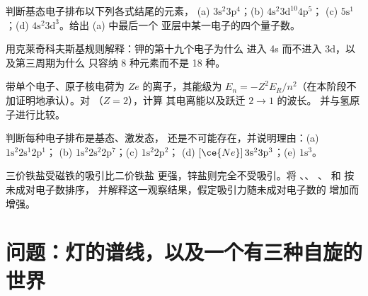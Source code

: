 \begin{exercise}[$\star\star$]\label{exo:b1:quantum-numbers:8}
判断基态电子排布以下列各式结尾的元素，
(a) $3\text{s}^2 3\text{p}^4$；(b) $4\text{s}^2 3\text{d}^{10} 4\text{p}^5$；
(c) $5\text{s}^1$；(d) $4\text{s}^2 3\text{d}^3$。给出 (a) 中最后一个
亚层中某一电子的四个量子数。
\end{exercise}

\begin{exercise}[$\star\star$]\label{exo:b1:quantum-numbers:9}
用克莱奇科夫斯基规则解释：钾的第十九个电子为什么
进入 4s 而不进入 3d，以及第三周期为什么
只容纳 8 种元素而不是 18 种。
\end{exercise}

\begin{exercise}[$\star\star\star$]\label{exo:b1:quantum-numbers:10}
带单个电子、原子核电荷为 $Ze$ 的离子，其能级为
$E_n = -Z^2 E_R/n^2$（在本阶段不加证明地承认）。对 （$Z = 2$），计算
其电离能以及跃迁 $2 \to 1$ 的波长。
并与氢原子进行比较。
\end{exercise}

\begin{exercise}[$\star\star\star$]\label{exo:b1:quantum-numbers:11}
判断每种电子排布是基态、激发态，
还是不可能存在，并说明理由：(a) $1\text{s}^2 2\text{s}^1 2\text{p}^1$；
(b) $1\text{s}^2 2\text{s}^2 2\text{p}^7$；(c) $1\text{s}^2 2\text{p}^2$；
(d) $[\ce{Ne}]\,3\text{s}^2 3\text{p}^3$；(e) $1\text{s}^3$。
\end{exercise}

\begin{exercise}[$\star\star\star$]\label{exo:b1:quantum-numbers:12}
三价铁盐受磁铁的吸引比二价铁盐
更强，锌盐则完全不受吸引。将 、、
、 和  按未成对电子数排序，
并解释这一观察结果，假定吸引力随未成对电子数的
增加而增强。
\end{exercise}

\section{问题：灯的谱线，以及一个有三种自旋的世界}

